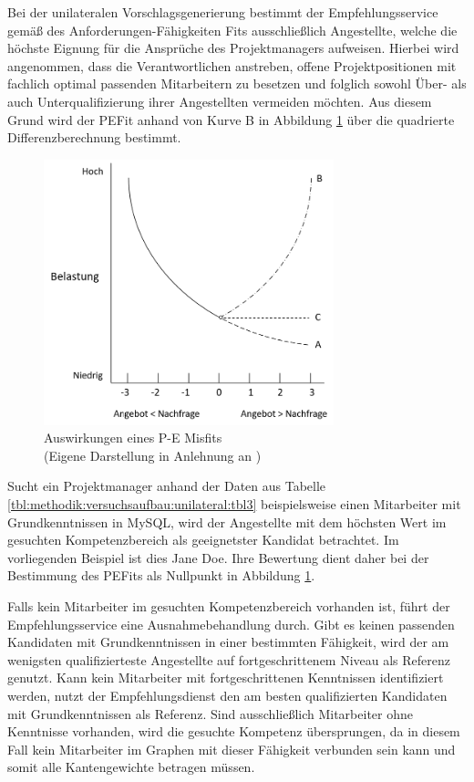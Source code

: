 Bei der unilateralen Vorschlagsgenerierung bestimmt der Empfehlungsservice gemäß des Anforderungen-Fähigkeiten Fits ausschließlich Angestellte, welche die höchste Eignung für die Ansprüche des Projektmanagers aufweisen. Hierbei wird angenommen, dass die Verantwortlichen anstreben, offene Projektpositionen mit fachlich optimal passenden Mitarbeitern zu besetzen und folglich sowohl Über- als auch Unterqualifizierung ihrer Angestellten vermeiden möchten. Aus diesem Grund wird der \ac{PEFit} anhand von Kurve B in Abbildung \ref{fig:methodik:versuchsaufbau:unilateral:abb2} über die quadrierte Differenzberechnung bestimmt.

\begin{figure}[h]
	\centering
	\includegraphics[width=0.75\textwidth]{gfx/ueberschuss_supply_motive.png}
	\caption[Auswirkungen eines P-E Misfits]{Auswirkungen eines P-E Misfits\\(Eigene Darstellung in Anlehnung an \cite[S. 23]{edwards:2008})}
	\label{fig:methodik:versuchsaufbau:unilateral:abb2}
\end{figure}
\newpage
Sucht ein Projektmanager anhand der Daten aus Tabelle \ref{tbl:methodik:versuchsaufbau:unilateral:tbl3} beispielsweise einen Mitarbeiter mit Grundkenntnissen in MySQL, wird der Angestellte mit dem höchsten Wert im gesuchten Kompetenzbereich als geeignetster Kandidat betrachtet. Im vorliegenden Beispiel ist dies Jane Doe. Ihre Bewertung dient daher bei der Bestimmung des \acp{PEFit} als Nullpunkt in Abbildung \ref{fig:methodik:versuchsaufbau:unilateral:abb2}.

Falls kein Mitarbeiter im gesuchten Kompetenzbereich vorhanden ist, führt der Empfehlungsservice eine Ausnahmebehandlung durch. Gibt es keinen passenden Kandidaten mit Grundkenntnissen in einer bestimmten Fähigkeit, wird der am wenigsten qualifizierteste Angestellte auf fortgeschrittenem Niveau als Referenz genutzt. Kann kein Mitarbeiter mit fortgeschrittenen Kenntnissen identifiziert werden, nutzt der Empfehlungsdienst den am besten qualifizierten Kandidaten mit Grundkenntnissen als Referenz. Sind ausschließlich Mitarbeiter ohne Kenntnisse vorhanden, wird die gesuchte Kompetenz übersprungen, da in diesem Fall kein Mitarbeiter im Graphen mit dieser Fähigkeit verbunden sein kann und somit alle Kantengewichte \nullWert betragen müssen.

